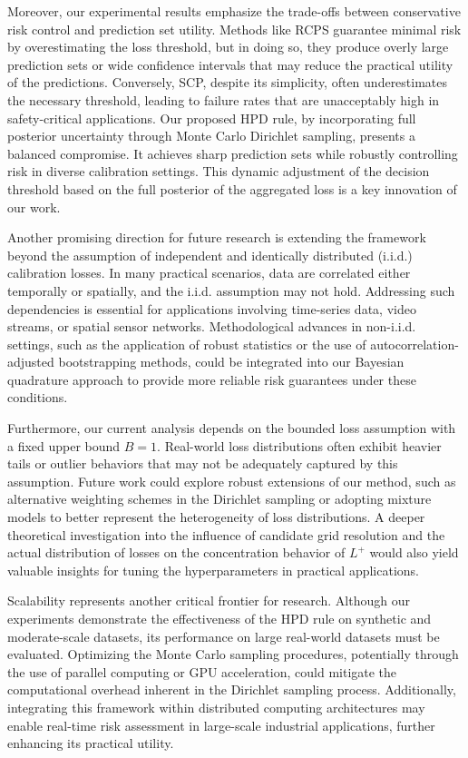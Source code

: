 \documentclass{article}
\begin{document}
Moreover, our experimental results emphasize the trade-offs between conservative risk control and prediction set utility. Methods like RCPS guarantee minimal risk by overestimating the loss threshold, but in doing so, they produce overly large prediction sets or wide confidence intervals that may reduce the practical utility of the predictions. Conversely, SCP, despite its simplicity, often underestimates the necessary threshold, leading to failure rates that are unacceptably high in safety-critical applications. Our proposed HPD rule, by incorporating full posterior uncertainty through Monte Carlo Dirichlet sampling, presents a balanced compromise. It achieves sharp prediction sets while robustly controlling risk in diverse calibration settings. This dynamic adjustment of the decision threshold based on the full posterior of the aggregated loss is a key innovation of our work.

Another promising direction for future research is extending the framework beyond the assumption of independent and identically distributed (i.i.d.) calibration losses. In many practical scenarios, data are correlated either temporally or spatially, and the i.i.d. assumption may not hold. Addressing such dependencies is essential for applications involving time-series data, video streams, or spatial sensor networks. Methodological advances in non-i.i.d. settings, such as the application of robust statistics or the use of autocorrelation-adjusted bootstrapping methods, could be integrated into our Bayesian quadrature approach to provide more reliable risk guarantees under these conditions.

Furthermore, our current analysis depends on the bounded loss assumption with a fixed upper bound \(B=1\). Real-world loss distributions often exhibit heavier tails or outlier behaviors that may not be adequately captured by this assumption. Future work could explore robust extensions of our method, such as alternative weighting schemes in the Dirichlet sampling or adopting mixture models to better represent the heterogeneity of loss distributions. A deeper theoretical investigation into the influence of candidate grid resolution and the actual distribution of losses on the concentration behavior of \(L^+\) would also yield valuable insights for tuning the hyperparameters in practical applications.

Scalability represents another critical frontier for research. Although our experiments demonstrate the effectiveness of the HPD rule on synthetic and moderate-scale datasets, its performance on large real-world datasets must be evaluated. Optimizing the Monte Carlo sampling procedures, potentially through the use of parallel computing or GPU acceleration, could mitigate the computational overhead inherent in the Dirichlet sampling process. Additionally, integrating this framework within distributed computing architectures may enable real-time risk assessment in large-scale industrial applications, further enhancing its practical utility.
\end{document}
